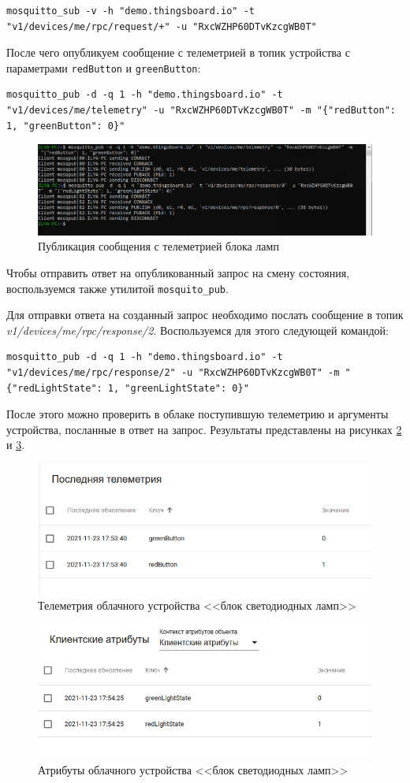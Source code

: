 \documentclass[a4paper,14pt]{extarticle}
\begin{document}
\begin{lstlisting}
mosquitto_sub -v -h "demo.thingsboard.io" -t "v1/devices/me/rpc/request/+" -u "RxcWZHP60DTvKzcgWB0T"
\end{lstlisting}

После чего опубликуем сообщение с телеметрией в топик устройства с параметрами
\texttt{redButton} и \texttt{greenButton}:

\begin{lstlisting}
mosquitto_pub -d -q 1 -h "demo.thingsboard.io" -t "v1/devices/me/telemetry" -u "RxcWZHP60DTvKzcgWB0T" -m "{"redButton": 1, "greenButton": 0}"
\end{lstlisting}

\begin{figure}[h!]
	\centering
	\includegraphics[width=0.6\linewidth]{images/t2-sender}
	\caption{Публикация сообщения с телеметрией блока ламп}
	\label{fig:t2-sender}
\end{figure}

Чтобы отправить ответ на опубликованный запрос на смену состояния, воспользуемся
также утилитой \texttt{mosquito\_pub}.

Для отправки ответа на созданный запрос необходимо послать сообщение в топик
\textit{v1/devices/me/rpc/response/2}. Воспользуемся для этого следующей командой:

\begin{lstlisting}
mosquitto_pub -d -q 1 -h "demo.thingsboard.io" -t "v1/devices/me/rpc/response/2" -u "RxcWZHP60DTvKzcgWB0T" -m "{"redLightState": 1, "greenLightState": 0}"
\end{lstlisting}

После этого можно проверить в облаке поступившую телеметрию и аргументы устройства,
посланные в ответ на запрос. Результаты представлены на рисунках \ref{fig:tel-2} и \ref{fig:attr-2}.

\begin{figure}[h!]
	\centering
	\includegraphics[width=0.6\linewidth]{images/tel-2}
	\caption{Телеметрия облачного устройства <<блок светодиодных ламп>>}
	\label{fig:tel-2}
\end{figure}


\begin{figure}[h!]
	\centering
	\includegraphics[width=0.6\linewidth]{images/attr-2}
	\caption{Атрибуты облачного устройства <<блок светодиодных ламп>>}
	\label{fig:attr-2}
\end{figure}
\end{document}
